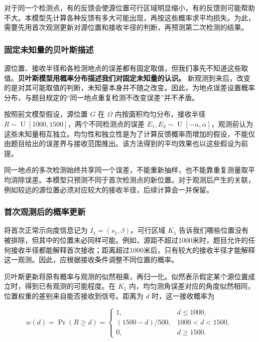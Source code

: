 对于同一个检测点，有的反馈会使源位置可行区域明显缩小，有的反馈则可能帮助不大。本模型先计算各种反馈有多大可能出现，再按这些概率求平均损失。为此，需要先用首次观测更新对源位置和接收半径的判断，再预测第二次检测的结果。

\subsubsection{固定未知量的贝叶斯描述}

源位置、接收半径和各检测地点的误差都有固定取值，但我们事先不知道这些取值。\textbf{贝叶斯模型用概率分布描述我们对固定未知量的认识。} 新观测到来后，改变的是对其可能取值的判断，未知量本身并不随之改变。因此，为地点误差设置概率分布，与题目规定的“同一地点重复检测不改变误差”并不矛盾。

按照前文模型假设，源位置 \(G\) 在 \(\Omega\) 内按面积均匀分布，接收半径 \(R\sim\operatorname{U}[1000,1500]\)，两个不同检测点的误差 \(E_1,E_2\sim\operatorname{U}[-\alpha,\alpha]\)，观测前认为这些未知量相互独立。均匀性和独立性是为了计算反馈概率而增加的假设，不能仅由题目给出的误差界与接收范围推出。该方法得到的平均效果也以这些假设为前提。

同一地点的多次检测始终共享同一个误差，不能重新抽样，也不能靠重复测量取平均消除误差。本模型只预测不同于首次检测点的新位置。对于观测后产生的关联，例如较远的源位置必须对应较大的接收半径，后续计算会一并保留。

\subsubsection{首次观测后的概率更新}

将首次正常示向度信息记为 \(I_1=(s_1,\beta)\)。可行区域 \(K_1\) 告诉我们哪些位置没有被排除，但其中的位置未必同样可能。例如，源距不超过1000米时，题目允许的任何接收半径都能解释首次接收；距离超过1000米后，只有较大的接收半径才能解释这一观测。因此，应根据接收条件调整不同位置的概率。

贝叶斯更新将原有概率与观测的似然相乘，再归一化。似然表示假定某个源位置成立时，得到已有观测的可能程度。在 \(K_1\) 内，均匀测角误差对应的角度似然相同，位置权重的差别来自能否接收到信号。距离为 \(d\) 时，这一接收概率为

\begin{equation}
 w(d)=\Pr(R\ge d)=
 \begin{cases}
 1,&d\le1000,\\
 (1500-d)/500,&1000<d<1500,\\
 0,&d\ge1500.
 \end{cases}
\label{eq:q2-pair-weight}
\end{equation}

